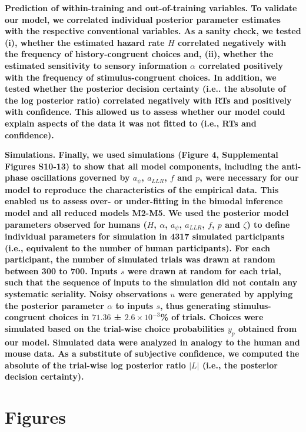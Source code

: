 \documentclass[
]{article}
\begin{document}
\textbf{Prediction of within-training and out-of-training variables. To
validate our model, we correlated individual posterior parameter
estimates with the respective conventional variables. As a sanity check,
we tested (i), whether the estimated hazard rate \(H\) correlated
negatively with the frequency of history-congruent choices and, (ii),
whether the estimated sensitivity to sensory information \(\alpha\)
correlated positively with the frequency of stimulus-congruent choices.
In addition, we tested whether the posterior decision certainty (i.e..
the absolute of the log posterior ratio) correlated negatively with RTs
and positively with confidence. This allowed us to assess whether our
model could explain aspects of the data it was not fitted to (i.e., RTs
and confidence).}

\textbf{Simulations. Finally, we used simulations (Figure 4,
Supplemental Figures S10-13) to show that all model components,
including the anti-phase oscillations governed by \(a_{\psi}\),
\(a_{LLR}\), \(f\) and \(p\), were necessary for our model to reproduce
the characteristics of the empirical data. This enabled us to assess
over- or under-fitting in the bimodal inference model and all reduced
models M2-M5. We used the posterior model parameters observed for humans
(\(H\), \(\alpha\), \(a_{\psi}\), \(a_{LLR}\), \(f\), \(p\) and
\(\zeta\)) to define individual parameters for simulation in 4317
simulated participants (i.e., equivalent to the number of human
participants). For each participant, the number of simulated trials was
drawn at random between 300 to 700. Inputs \(s\) were drawn at random
for each trial, such that the sequence of inputs to the simulation did
not contain any systematic seriality. Noisy observations \(u\) were
generated by applying the posterior parameter \(\alpha\) to inputs
\(s\), thus generating stimulus-congruent choices in \(71.36\) ±
\(\ensuremath{2.6\times 10^{-3}}\)\% of trials. Choices were simulated
based on the trial-wise choice probabilities \(y_{p}\) obtained from our
model. Simulated data were analyzed in analogy to the human and mouse
data. As a substitute of subjective confidence, we computed the absolute
of the trial-wise log posterior ratio \(|L|\) (i.e., the posterior
decision certainty).}

\newpage

\hypertarget{figures}{%
\section{Figures}\label{figures}}
\end{document}
